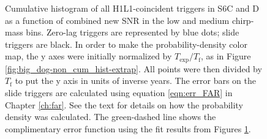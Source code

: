 \begin{figure}[p]
\center
{}
\caption{Cumulative histogram of all H1L1-coincident triggers in S6C and D as a function
of combined new \ac{SNR} in the low and medium chirp-mass bins. Zero-lag
triggers are represented by blue dots; slide triggers are black. In order to
make the probability-density color map, the y axes were initially normalized by
$T_{\mathrm{exp}}/T_{\mathrm{f}}$, as in Figure
\ref{fig:big_dog-non_cum_hist-extrap}. All points were then divided by
$T_{\mathrm{f}}$ to put the y axis in units of inverse years. The error bars on
the slide triggers are calculated using equation \ref{eqn:err_FAR} in Chapter
\ref{ch:far}. See the text for details on how the probability density was
calculated. The green-dashed line shows the complimentary error function using
the fit results from Figures \ref{fig:big_dog-cum_hist-extrap}.}
\label{fig:big_dog-cum_hist-extrap}
\end{figure}


